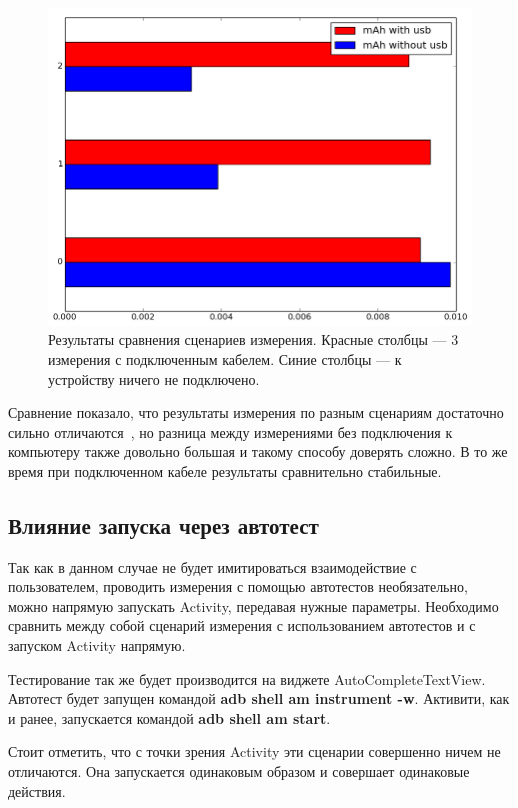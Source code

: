 \documentclass[a4paper,14pt]{extarticle} %
\begin{document}
	\begin{figure}[tbh]
		\includegraphics[width=\textwidth]{usb_comparation}
		\caption{Результаты сравнения сценариев измерения. Красные столбцы --- 3 измерения с подключенным кабелем. Синие столбцы --- к устройству ничего не подключено.}
		\label{fig:usb_comparation}
	\end{figure}

	Сравнение показало, что результаты измерения по разным сценариям достаточно сильно отличаются~\ris{\ref{fig:usb_comparation}}, но разница между измерениями без подключения к компьютеру также довольно большая и такому способу доверять сложно. В то же время при подключенном кабеле результаты сравнительно стабильные.
	
	\subsection{Влияние запуска через автотест}
	
	Так как в данном случае не будет имитироваться взаимодействие с пользователем, проводить измерения с помощью автотестов необязательно, можно напрямую запускать Activity, передавая нужные параметры. Необходимо сравнить между собой сценарий измерения с использованием автотестов и с запуском Activity напрямую.
	
	Тестирование так же будет производится на виджете AutoCompleteTextView. Автотест будет запущен командой \textbf{adb shell am instrument -w}. Активити, как и ранее, запускается командой \textbf{adb shell am start}.
	
	Стоит отметить, что с точки зрения Activity эти сценарии совершенно ничем не отличаются. Она запускается одинаковым образом и совершает одинаковые действия.
	
\end{document}
